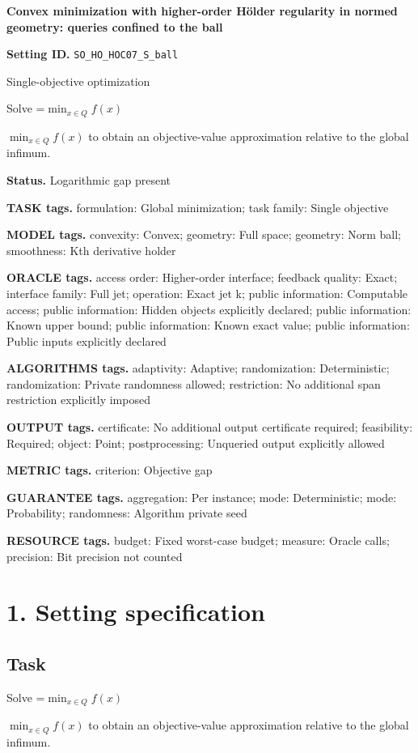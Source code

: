 \documentclass[10pt,a4paper]{article}
\newcommand{\AtlasMath}[1]{\par\begingroup\centering\setbox0=\hbox{$\displaystyle #1$}\ifdim\wd0>1.4\linewidth\typeout{ATLAS WIDE FORMULA: \the\wd0}\fi\ifdim\wd0>\linewidth\resizebox{\linewidth}{!}{\box0}\else\box0\fi\par\endgroup}
\newcommand{\AtlasInlineMath}[1]{\begingroup\setbox0=\hbox{$#1$}\ifdim\wd0>.4\linewidth\endgroup\AtlasMath{#1}\else\endgroup$#1$\fi}
\begin{document}
\raggedright

{\LARGE\bfseries\sffamily\color{AtlasNavy} Convex minimization with higher-order Hölder regularity in normed geometry: queries confined to the ball\par}\vspace{5pt}
\textbf{Setting ID.} \texttt{SO\_\allowbreak{}HO\_\allowbreak{}HOC07\_\allowbreak{}S\_\allowbreak{}ball}

Single-objective optimization

Solve \AtlasInlineMath{\min_{x\in Q}f(x)} to obtain an objective-value approximation relative to the global infimum.

\textbf{Status.} Logarithmic gap present

\textbf{TASK tags.} formulation: Global minimization; task family: Single objective

\textbf{MODEL tags.} convexity: Convex; geometry: Full space; geometry: Norm ball; smoothness: Kth derivative holder

\textbf{ORACLE tags.} access order: Higher-order interface; feedback quality: Exact; interface family: Full jet; operation: Exact jet k; public information: Computable access; public information: Hidden objects explicitly declared; public information: Known upper bound; public information: Known exact value; public information: Public inputs explicitly declared

\textbf{ALGORITHMS tags.} adaptivity: Adaptive; randomization: Deterministic; randomization: Private randomness allowed; restriction: No additional span restriction explicitly imposed

\textbf{OUTPUT tags.} certificate: No additional output certificate required; feasibility: Required; object: Point; postprocessing: Unqueried output explicitly allowed

\textbf{METRIC tags.} criterion: Objective gap

\textbf{GUARANTEE tags.} aggregation: Per instance; mode: Deterministic; mode: Probability; randomness: Algorithm private seed

\textbf{RESOURCE tags.} budget: Fixed worst-case budget; measure: Oracle calls; precision: Bit precision not counted

\section{1. Setting specification}
\subsection{Task}
Solve \AtlasInlineMath{\min_{x\in Q}f(x)} to obtain an objective-value approximation relative to the global infimum.
\end{document}
